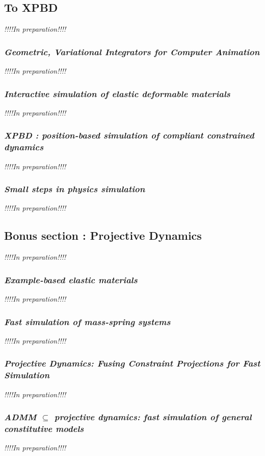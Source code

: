 \documentclass[pdflatex,sn-mathphys-num]{sn-jnl}%
\theoremstyle{thmstyleone}%
\theoremstyle{thmstyletwo}%
\theoremstyle{thmstylethree}%
\newcommand{\inprep}{
	\begin{center}
		\sl\rm {!!!!In preparation!!!!}
\end{center}}
\begin{document}
\subsection{To XPBD}
\inprep
\subsubsection{{\sl Geometric, Variational Integrators for Computer Animation}\cite{VariationalIntegrators2006}}
\inprep
\subsubsection{{\sl Interactive simulation of elastic deformable materials}\cite{Servin2006InteractiveSO}}
\inprep
\subsubsection{\small{\sl XPBD : position-based simulation of compliant constrained dynamics}\cite{XPBD}}
\inprep

\subsubsection{{\sl Small steps in physics simulation}\cite{SmallSteps}}
\inprep
\subsection{Bonus section : Projective Dynamics}
\inprep
\subsubsection{{\sl Example-based elastic materials}\cite{Example-basedMartin}}
\inprep
\subsubsection{{\sl Fast simulation of mass-spring systems}\cite{fastMassTiantian}}
\inprep
\subsubsection{\small{\sl Projective Dynamics: Fusing Constraint Projections for Fast Simulation}\cite{ProjDyn}}
\inprep
\subsubsection{\small{\sl ADMM $\subseteq$ projective dynamics: fast simulation of general constitutive models}\cite{ADMM_Proj}}
\inprep
\end{document}
